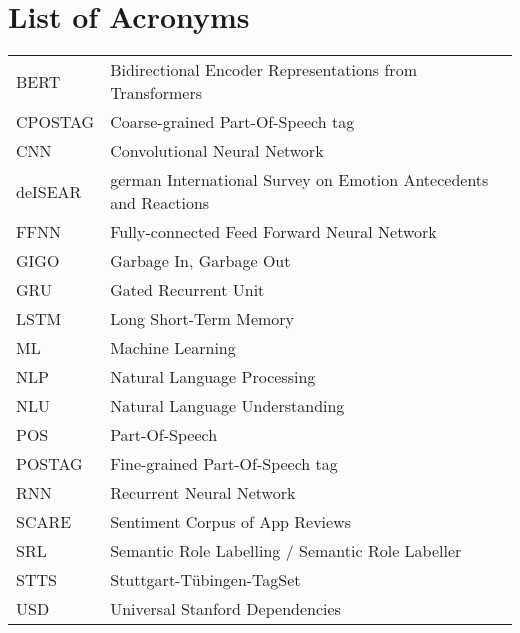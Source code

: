 {}
\chapter*{List of Acronyms}

\begin{supertabular}{lp{12.5cm}}
BERT    & Bidirectional Encoder Representations from Transformers\\
CPOSTAG &  Coarse-grained Part-Of-Speech tag\\
CNN     & Convolutional Neural Network\\
deISEAR & german International Survey on Emotion Antecedents and Reactions\\
FFNN    & Fully-connected Feed Forward Neural Network\\
GIGO    & Garbage In, Garbage Out\\
GRU     & Gated Recurrent Unit\\
LSTM    & Long Short-Term Memory\\
ML      & Machine Learning\\
NLP     & Natural Language Processing\\
NLU     & Natural Language Understanding\\
POS     & Part-Of-Speech\\
POSTAG  & Fine-grained Part-Of-Speech tag\\
RNN     & Recurrent Neural Network\\
SCARE   & Sentiment Corpus of App Reviews\\
SRL     & Semantic Role Labelling / Semantic Role Labeller\\
STTS    & Stuttgart-Tübingen-TagSet\\
USD     & Universal Stanford Dependencies\\
\end{supertabular}

\newpage

